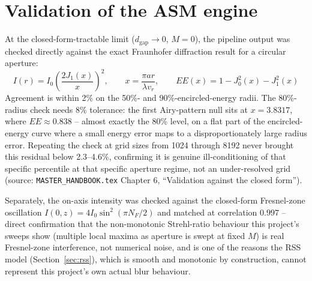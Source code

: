 \section{Validation of the ASM engine}
\label{sec:asm-validation}
At the closed-form-tractable limit ($d_{\mathrm{gap}}\to0$, $M=0$), the pipeline output
was checked directly against the exact Fraunhofer diffraction result for a circular
aperture:
\begin{equation}
I(r) = I_0\left(\frac{2J_1(x)}{x}\right)^2, \qquad x = \frac{\pi a r}{\lambda v_r},
\qquad
EE(x) = 1 - J_0^2(x) - J_1^2(x)
\end{equation}
Agreement is within 2\% on the 50\%- and 90\%-encircled-energy radii. The 80\%-radius
check needs 8\% tolerance: the first Airy-pattern null sits at $x=3.8317$, where
$EE\approx0.838$ -- almost exactly the 80\% level, on a flat part of the encircled-energy
curve where a small energy error maps to a disproportionately large radius error.
Repeating the check at grid sizes from 1024 through 8192 never brought this residual
below 2.3--4.6\%, confirming it is genuine ill-conditioning of that specific percentile
at that specific aperture regime, not an under-resolved grid (source:
\texttt{MASTER\_HANDBOOK.tex} Chapter 6, ``Validation against the closed form'').

Separately, the on-axis intensity was checked against the closed-form Fresnel-zone
oscillation $I(0,z)=4I_0\sin^2(\pi N_F/2)$ and matched at correlation $0.997$ -- direct
confirmation that the non-monotonic Strehl-ratio behaviour this project's sweeps show
(multiple local maxima as aperture is swept at fixed $M$) is real Fresnel-zone
interference, not numerical noise, and is one of the reasons the RSS model
(Section~\ref{sec:rss}), which is smooth and monotonic by construction, cannot
represent this project's own actual blur behaviour.

